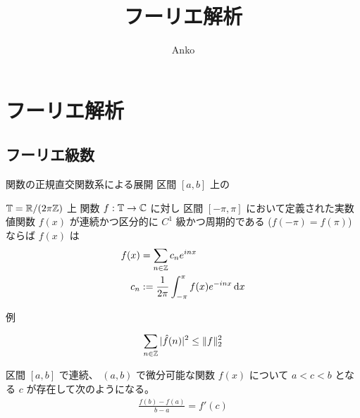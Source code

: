 \documentclass[uplatex,dvipdfmx,a4paper,11pt]{jlreq}
\title{フーリエ解析}
\author{Anko}
\begin{document}
\maketitle
\tableofcontents
\clearpage

\section{フーリエ解析}
\subsection{フーリエ級数}
\begin{definition}[内積]
  関数の正規直交関数系による展開
  区間 $[a, b]$ 上の
\end{definition}


\begin{definition}[複素フーリエ級数]
  $\mathbb{T} = \mathbb{R}/(2\pi\mathbb{Z})$ 上 関数 $f: \mathbb{T}\to\mathbb{C}$ に対し
  区間 $[-\pi, \pi]$ において定義された実数値関数 $f(x)$ が連続かつ区分的に $C^1$ 級かつ周期的である ($f(-\pi) = f(\pi)$) ならば $f(x)$ は
  \begin{align}
    f(x) & = \sum_{n\in\ZZ}c_ne^{inx}                          \\
    c_n  & := \frac{1}{2\pi}\int_{-\pi}^\pi f(x)e^{-inx}\dl{x}
  \end{align}
\end{definition}
例
\begin{theorem}
  \begin{align}
    \sum_{n\in\mathbb{Z}}|\hat{f}(n)|^2 \leq \|f\|_2^2
  \end{align}
\end{theorem}


\begin{theorem}[平均値の定理]
  区間 $[a, b]$ で連続、 $(a, b)$ で微分可能な関数 $f(x)$ について $a < c < b$ となる $c$ が存在して次のようになる。
  \begin{align}
    \frac{f(b) - f(a)}{b - a} = f'(c)
  \end{align}
\end{theorem}
\end{document}
